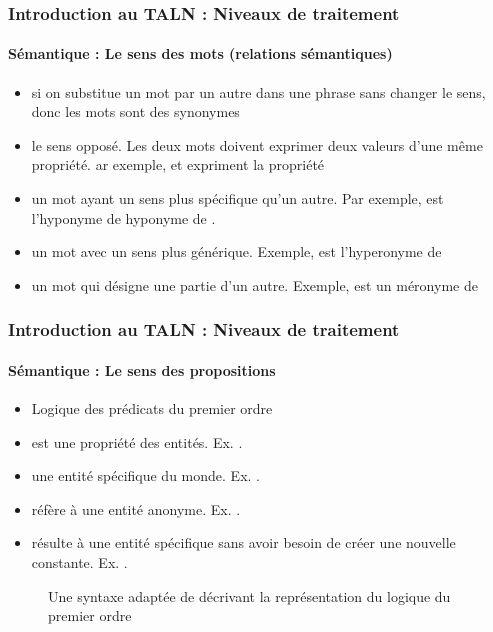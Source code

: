 \documentclass[xcolor=table]{beamer}
\begin{document}
\begin{frame}
\frametitle{Introduction au TALN : Niveaux de traitement}
\framesubtitle{Sémantique : Le sens des mots (relations sémantiques)}

\begin{itemize}
	\item {} si on substitue un mot par un autre dans une phrase sans changer le sens, donc les mots sont des synonymes
	\item {} le sens opposé. Les deux mots doivent exprimer deux valeurs d'une même propriété. ar exemple,  et  expriment la propriété 
	\item {} un mot ayant un sens plus spécifique qu'un autre. Par exemple,  est l'hyponyme de  hyponyme de . 
	\item {} un mot avec un sens plus générique. Exemple,  est l'hyperonyme de 
	\item {} un mot qui désigne une partie d'un autre. Exemple,  est un méronyme de 
\end{itemize}

\end{frame}

\begin{frame}
\frametitle{Introduction au TALN : Niveaux de traitement}
\framesubtitle{Sémantique : Le sens des propositions}

\begin{minipage}{0.5\textwidth}
\begin{itemize}
	\item Logique des prédicats du premier ordre
	\item {} est une propriété des entités. Ex. .	
	\item {} une entité spécifique du monde. Ex. .
	\item {} réfère à une entité anonyme. Ex. .
	\item {} résulte à une entité spécifique sans avoir besoin de créer une nouvelle constante. Ex. .
\end{itemize}
\end{minipage}
\begin{minipage}{0.48\textwidth}
	\begin{figure}
		\caption{Une syntaxe adaptée de \cite{2002-russell-norvig} décrivant la représentation du logique du premier ordre \cite{2019-jurafsky-martin}}
	\end{figure}
\end{minipage}

\end{frame}
\end{document}
